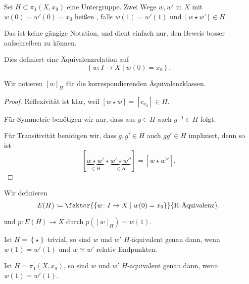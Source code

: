
\begin{definition*}\label{def:h-äquivalent-für-untegruppen}
    Sei $H\subset \pi_1(X,x_0)$ eine Untergruppe. Zwei Wege $w,w'$ in  $X$ mit  $w(0) = w'(0) = x_0$ heißen , falls $w(1) = w'(1)$ und  $[w \star \overline{w}']\in H$. 
\end{definition*}

\begin{oral}
Das ist keine gängige Notation, und dient einfach nur, den Beweis besser aufschreiben zu können.    
\end{oral}

\begin{lemma}\label{lm:h-äquivalent-ist-äquivalenzrelation}
    Dies definiert eine Äquivalenzrelation auf
    \[
        \left \{w\colon  I \to  X \mid w(0) = x_0\right\} 
    .\] 
\end{lemma}

\begin{notation*}
    Wir notieren $[w]_H$ für die korrespondierenden Äquivalenzklassen.
\end{notation*}

\begin{proof}
    Reflexivität ist klar, weil $[w \star \overline{w}] = [c_{x_0}] \in H$.

    Für Symmetrie benötigen wir nur, dass aus $g\in H$ auch $g^{-1}\in H$ folgt.

    Für Transitivität benötigen wir, dass $g,g'\in H$ auch $gg'\in H$ impliziert, denn so ist
    \[
        [\underbrace{w \star \overline{w'}}_{\in H} \star \underbrace{w' \star \overline{w''}}_{\in H}] = [ w \star \overline{w''}]
    .\] 
\end{proof}

Wir definieren
\[
    E(H) \coloneqq  \faktor{\left \{w\colon  I \to  X \mid  w(0) = x_0\right\} }{\text{H-Äquivalenz}}
.\] 

und $p\colon E(H) \to  X$ durch $p([w]_H) = w(1)$.

 \begin{example}
     Ist $H = \left \{\star\right\} $ trivial, so sind $w$ und  $w'$  $H$-äquivalent genau dann, wenn  $w(1) = w'(1)$ und  $w \simeq w'$ relativ Endpunkten.

     Ist  $H = \pi_1(X,x_0)$, so sind $w$ und  $w'$  $H$-äquivalent genau dann, wenn  $w(1) = w'(1)$.
\end{example}


